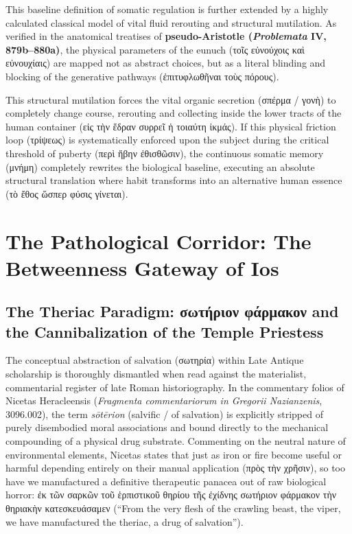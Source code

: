 \documentclass[11pt,twoside,a4paper]{article}
\begin{document}
This baseline definition of somatic regulation is further extended by a highly calculated classical model of vital fluid rerouting and structural mutilation. As verified in the anatomical treatises of \textbf{pseudo-Aristotle (\textit{Problemata} IV, 879b--880a)}, the physical parameters of the eunuch (\textgreek{τοῖς εὐνούχοις καὶ εὐνουχίαις}) are mapped not as abstract choices, but as a literal blinding and blocking of the generative pathways (\textgreek{ἐπιτυφλωθῆναι τοὺς πόρους}). 

This structural mutilation forces the vital organic secretion (\textgreek{σπέρμα / γονὴ}) to completely change course, rerouting and collecting inside the lower tracts of the human container (\textgreek{εἰς τὴν ἕδραν συρρεῖ ἡ τοιαύτη ἰκμάς}). If this physical friction loop (\textgreek{τρίψεως}) is systematically enforced upon the subject during the critical threshold of puberty (\textgreek{περὶ ἥβην ἐθισθῶσιν}), the continuous somatic memory (\textgreek{μνήμη}) completely rewrites the biological baseline, executing an absolute structural translation where habit transforms into an alternative human essence (\textgreek{τὸ ἔθος ὥσπερ φύσις γίνεται}).


\section{The Pathological Corridor: The Betweenness Gateway of Ios}

\subsection{The Theriac Paradigm: \textgreek{σωτήριον φάρμακον} and the Cannibalization of the Temple Priestess}
The conceptual abstraction of salvation (\textgreek{σωτηρία}) within Late Antique scholarship is thoroughly dismantled when read against the materialist, commentarial register of late Roman historiography. In the commentary folios of Nicetas Heracleensis (\textit{Fragmenta commentariorum in Gregorii Nazianzenis}, 3096.002), the term \textit{sōtērion} (salvific / of salvation) is explicitly stripped of purely disembodied moral associations and bound directly to the mechanical compounding of a physical drug substrate. Commenting on the neutral nature of environmental elements, Nicetas states that just as iron or fire become useful or harmful depending entirely on their manual application (\textgreek{πρὸς τὴν χρῆσιν}), so too have we manufactured a definitive therapeutic panacea out of raw biological horror: \textgreek{ἐκ τῶν σαρκῶν τοῦ ἑρπιστικοῦ θηρίου τῆς ἐχίδνης σωτήριον φάρμακον τὴν θηριακὴν κατεσκευάσαμεν} (``From the very flesh of the crawling beast, the viper, we have manufactured the theriac, a drug of salvation'').
\end{document}

